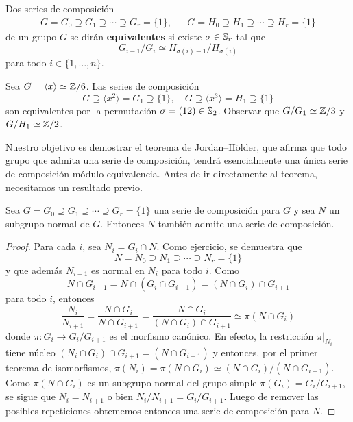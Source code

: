 \begin{definition}
Dos series de composición
\begin{align*}
G=G_0\supseteq G_1\supseteq\cdots\supseteq G_r=\{1\}, &&
G=H_0\supseteq H_1\supseteq\cdots\supseteq H_r=\{1\}	
\end{align*}
de un grupo $G$ se dirán \textbf{equivalentes} si existe $\sigma\in\mathbb{S}_r$ tal que 
\[
G_{i-1}/G_i\simeq H_{\sigma(i)-1}/H_{\sigma(i)}
\]
para todo $i\in\{1,\dots,n\}$.  
\end{definition}

\begin{example}
Sea $G=\langle x\rangle\simeq\mathbb{Z}/6$. Las series de composición
\[
G\supseteq\langle x^2\rangle=G_1\supseteq\{1\},\quad
G\supseteq\langle x^3\rangle=H_1\supseteq\{1\}
\]
son equivalentes por la permutación $\sigma=(12)\in\mathbb{S}_2$. Observar que $G/G_1\simeq\mathbb{Z}/3$ y $G/H_1\simeq\mathbb{Z}/2$. 	
\end{example}

Nuestro objetivo es demostrar el teorema de Jordan--Hölder, que afirma que todo grupo que admita una serie de composición, tendrá esencialmente 
una única serie de composición módulo equivalencia. Antes de ir directamente al teorema, necesitamos un resultado previo. 

\begin{lemma}
Sea $G=G_0\supseteq G_1\supseteq \cdots\supseteq G_r=\{1\}$ una serie de composición para $G$ y sea $N$ un subgrupo normal de $G$. Entonces $N$ 
también admite una serie de composición.	
\end{lemma}

\begin{proof}
Para cada $i$, sea $N_i=G_i\cap N$. Como ejercicio, se demuestra que  
\[
N=N_0\supseteq N_1\supseteq\cdots\supseteq N_r=\{1\}
\]
y que además $N_{i+1}$ es normal en $N_i$ para todo $i$. Como
\[
N\cap G_{i+1}=N\cap (G_i\cap G_{i+1})=(N\cap G_i)\cap G_{i+1}
\]
para todo $i$, entonces
\[
\frac{N_i}{N_{i+1}}=\frac{N\cap G_i}{N\cap G_{i+1}}=\frac{N\cap G_i}{(N\cap G_i)\cap G_{i+1}}
\simeq \pi(N\cap G_i)%
\]
donde $\pi\colon G_i\to G_i/G_{i+1}$ es el morfismo canónico. En efecto, la restricción $\pi|_{N_i}$ tiene núcleo
$(N_i\cap G_i)\cap G_{i+1}=(N\cap G_{i+1})$ y entonces, por el primer teorema de isomorfismos, $\pi(N_i)=\pi(N\cap G_i)\simeq (N\cap G_i)/(N\cap G_{i+1})$.   
Como $\pi(N\cap G_i)$ es un subgrupo normal del grupo simple $\pi(G_i)=G_i/G_{i+1}$, se sigue que $N_i=N_{i+1}$ o bien $N_i/N_{i+1}=G_i/G_{i+1}$. Luego de remover
las posibles repeticiones obtememos entonces una serie de composición para $N$.   	
\end{proof}

